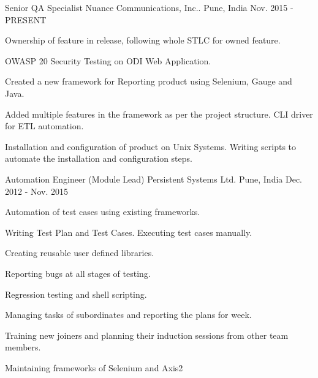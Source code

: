 

\begin{cventries}

  \cventry
    {Senior QA Specialist} %
    {Nuance Communications, Inc..} %
    {Pune, India} %
    {Nov. 2015 - PRESENT} %
    {
      \begin{cvitems} %
        \item {Ownership of feature in release, following whole STLC for owned feature.}
		\item {OWASP 20 Security Testing on ODI Web Application.}
        \item {Created a new framework for Reporting product using Selenium, Gauge and Java.}
        \item {Added multiple features in the framework as per the project structure. CLI driver for ETL automation.}
        \item {Installation and configuration of product on Unix Systems. Writing scripts to automate the installation and configuration steps.}
      \end{cvitems}
    }

  \cventry
    {Automation Engineer (Module Lead)} %
    {Persistent Systems Ltd.} %
    {Pune, India} %
    {Dec. 2012 - Nov. 2015} %
    {
      \begin{cvitems} %
      \item {Automation of test cases using existing frameworks.}
      \item {Writing Test Plan and Test Cases. Executing test cases manually.}
       \item {Creating reusable user defined libraries.}
      \item {Reporting bugs at all stages of testing.}
     \item {Regression testing and shell scripting.}
     \item {Managing tasks of subordinates and reporting the plans for week.}
     \item {Training new joiners and planning their induction sessions from other team members.}
   \item {Maintaining frameworks of Selenium and Axis2}
      \end{cvitems}
    }


\end{cventries}
